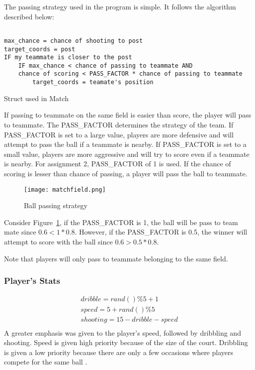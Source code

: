 \documentclass{article}
\begin{document}
The passing strategy used in the program is simple. It follows the algorithm described below:
\begin{program}[H]
\begin{verbatim}

max_chance = chance of shooting to post
target_coords = post
IF my teammate is closer to the post
    IF max_chance < chance of passing to teammate AND 
    chance of scoring < PASS_FACTOR * chance of passing to teammate
        target_coords = teamate's position
\end{verbatim}
  \caption{Struct used in Match}
\end{program}
If passing to teammate on the same field is easier than score, the player will pass to teammate. The PASS\_FACTOR determines the strategy of the team. If PASS\_FACTOR is set to a large value, players are more defensive and will attempt to pass the ball if a teammate is nearby. If PASS\_FACTOR is set to a small value, players are more aggressive and will try to score even if a teammate is nearby. For assignment 2, PASS\_FACTOR of 1 is used. If the chance of scoring is lesser than chance of passing, a player will pass the ball to teammate.

\begin{figure}[H]
\centering
\texttt{[image: matchfield.png]}
\caption{Ball passing strategy}
\label{pic:matchfield}
\end{figure}

Consider Figure~\ref{pic:matchfield}, if the PASS\_FACTOR is 1, the ball will be pass to team mate since $0.6 < 1*0.8$. However, if the PASS\_FACTOR is 0.5, the winner will attempt to score with the ball since $0.6 > 0.5 * 0.8$.

Note that players will only pass to teammate belonging to the same field. 

\subsubsection{Player's Stats}
\begin{align*}
dribble = rand() \% 5 + 1\\
speed = 5 + rand() \% 5 \\
shooting = 15 - dribble - speed \\
\end{align*}
A greater emphasis was given to the player's speed, followed by dribbling and shooting. Speed is given high priority because of the size of the court. Dribbling is given a low priority because there are only a few occasions where players compete for the same ball .
\end{document}
